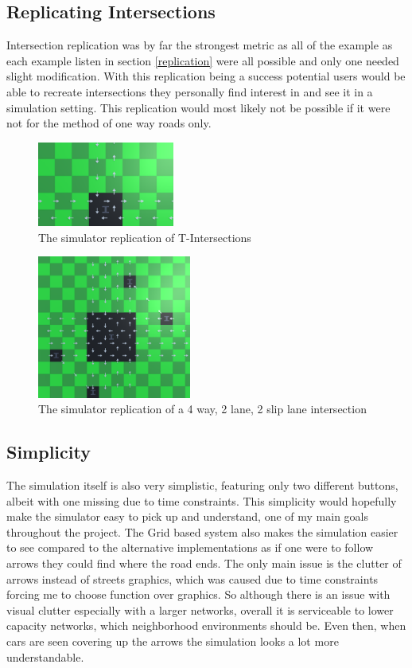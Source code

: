 \documentclass[10pt,twocolumn]{article}
\begin{document}
\subsection{Replicating Intersections}
\label{replicatingResults}
Intersection replication was by far the strongest metric as all of the example as each example listen in section \ref{replication} were all possible and only one needed slight modification. With this replication being a success potential users would be able to recreate intersections they personally find interest in and see it in a simulation setting. This replication would most likely not be possible if it were not for the method of one way roads only.
\begin{figure}[h]
\caption{The simulator replication of T-Intersections}
\centering
\includegraphics[width=0.4\textwidth]{TZOOMED.png}
\end{figure}
\begin{figure}[h]
\caption{The simulator replication of a 4 way, 2 lane, 2 slip lane intersection}
\centering
\includegraphics[width=0.45\textwidth]{422ZOOMED.png}
\end{figure}
\subsection{Simplicity}
The simulation itself is also very simplistic, featuring only two different buttons, albeit with one missing due to time constraints. This simplicity would hopefully make the simulator easy to pick up and understand, one of my main goals throughout the project. The Grid based system also makes the simulation easier to see compared to the alternative implementations as if one were to follow arrows they could find where the road ends. The only main issue is the clutter of arrows instead of streets graphics, which was caused due to time constraints forcing me to choose function over graphics. So although there is an issue with visual clutter especially with a larger networks, overall it is serviceable to lower capacity networks, which neighborhood environments should be. Even then, when cars are seen covering up the arrows the simulation looks a lot more understandable. 
\end{document}
